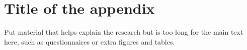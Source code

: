 \chapter{Title of the appendix}
Put material that helps explain the research but is too long for the main text here, such as questionnaires or extra figures and tables.
